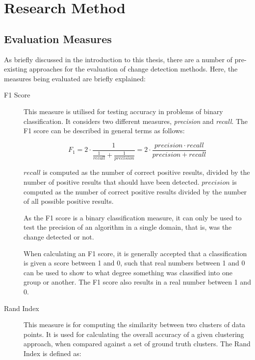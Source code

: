 \documentclass{uvamscse}	%
\begin{document}
\chapter{Research Method}
\label{Research Method}

\section{Evaluation Measures}

As briefly discussed in the introduction to this thesis, there are a number of pre-existing approaches for the evaluation of change detection methods. Here, the measures being evaluated are briefly explained:

\begin{description}
	\item[F1 Score] This measure is utilised for testing accuracy in problems of binary classification. It considers two different measures, \emph{precision} and \emph{recall}. The F1 score can be described in general terms as follows:

	\begin{equation}
		F_1 = 2 \cdot \frac{1}{\frac{1}{recall} + \frac{1}{precision}} = 2 \cdot \frac{precision \cdot recall}{precision+recall}
		\label{equ:F1}
	\end{equation}

	$recall$ is computed as the number of correct positive results, divided by the number of positive results that should have been detected. $precision$ is computed as the number of correct positive results divided by the number of all possible positive results.

	As the F1 score is a binary classification measure, it can only be used to test the precision of an algorithm in a single domain, that is, was the change detected or not.
	
	When calculating an F1 score, it is generally accepted that a classification is given a score between 1 and 0, such that real numbers between 1 and 0 can be used to show to what degree something was classified into one group or another. The F1 score also results in a real number between 1 and 0.

	\item[Rand Index] This measure is for computing the similarity between two clusters of data points. It is used for calculating the overall accuracy of a given clustering approach, when compared against a set of ground truth clusters. The Rand Index is defined as:


\end{description}
\end{document}
